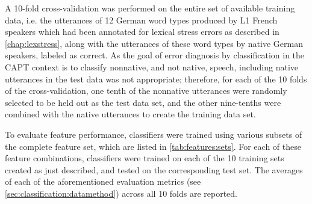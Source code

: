 		A 10-fold cross-validation was performed on the entire set of available training data, i.e. the utterances of 12 German word types produced by L1 French speakers which had been annotated for lexical stress errors as described in \cref{chap:lexstress}, along with the	utterances of these word types by native German speakers, labeled as correct. As the goal of  error diagnosis by classification in the CAPT context is to classify nonnative, and not native, speech, including native utterances in the test data was not appropriate; therefore, for each of the 10 folds of the cross-validation, one tenth of the nonnative utterances were randomly selected to be held out as the test data set, and the other nine-tenths were combined with the native utterances to create the training data set. 
		
		To evaluate feature performance, classifiers were trained using various subsets of the complete feature set,
		which are listed in \cref{tab:features:sets}. For each of these feature combinations, classifiers were trained on each of the 10 training sets created as just described, and tested on the corresponding test set. The averages of each of the aforementioned evaluation metrics (see \cref{sec:classification:datamethod}) across all 10 folds are reported.

